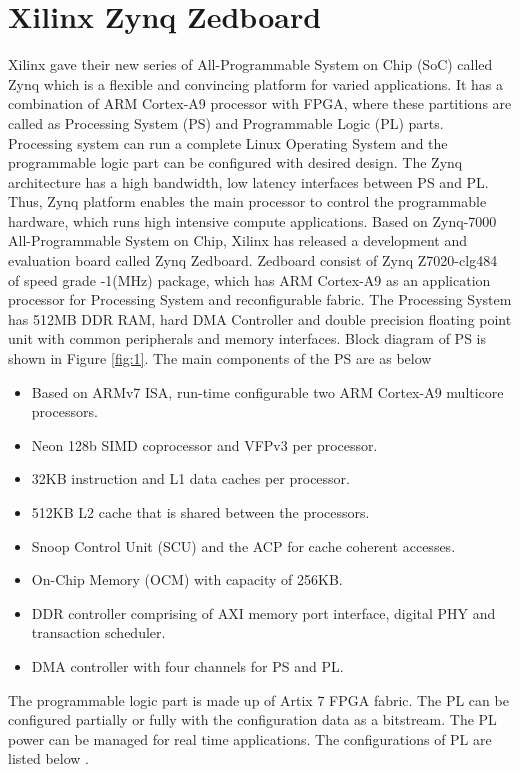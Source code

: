 \section{Xilinx Zynq Zedboard}
Xilinx gave their new series of All-Programmable System on Chip (SoC) called Zynq which is a flexible and convincing platform for varied applications. It has a combination of ARM Cortex-A9 processor with FPGA, where these partitions are called as Processing System (PS) and Programmable Logic (PL) parts. Processing system can run a complete Linux Operating System and the programmable logic part can be configured with desired design. The Zynq architecture has a high bandwidth, low latency interfaces between PS and PL. Thus, Zynq platform enables the main processor to control the programmable hardware, which runs high intensive compute applications. Based on Zynq-7000 All-Programmable System on Chip, Xilinx has released a development and evaluation board called Zynq Zedboard. Zedboard consist of Zynq Z7020-clg484 of speed grade -1(MHz) package, which has ARM Cortex-A9 as an application processor for Processing System and reconfigurable fabric. The Processing System has 512MB DDR RAM, hard DMA Controller and double precision floating point unit with common peripherals and memory interfaces. Block diagram of PS is shown in Figure \ref{fig:1}\cite{11}. The main components of the PS are as below

\begin{itemize}\itemsep0em 
	\item Based on ARMv7 ISA, run-time configurable two ARM Cortex-A9 multicore processors.
	\item Neon 128b SIMD coprocessor and VFPv3 per processor.
	\item 32KB instruction and L1 data caches per processor.
	\item 512KB L2 cache that is shared between the processors.
	\item Snoop Control Unit (SCU) and the ACP for cache coherent accesses.
	\item On-Chip Memory (OCM) with capacity of 256KB.
	\item DDR controller comprising of AXI memory port interface, digital PHY and transaction scheduler.
	\item DMA controller with four channels for PS and PL.
\end{itemize}


The programmable logic part is made up of Artix 7 FPGA fabric. The PL can be configured partially or fully with the configuration data as a bitstream. The PL power can be managed for real time applications. The configurations of PL are listed below \cite{23}.

